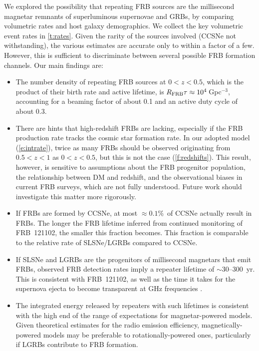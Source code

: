 \documentclass[twocolumn]{aastex6}
\newcommand{\apx}{\ensuremath{\sim}}
\newcommand{\repeater}{FRB~121102}
\begin{document}
We explored the possibility that repeating FRB sources are the millisecond magnetar remnants of superluminous supernovae and GRBs, by comparing volumetric rates and host galaxy demographics. We collect the key volumetric event rates in \autoref{t:rates}. Given the rarity of the sources involved (CCSNe not withstanding), the various estimates are accurate only to within a factor of a few. However, this is sufficient to discriminate between several possible FRB formation channels. Our main findings are:
\begin{itemize}

\item The number density of repeating FRB sources at $0<z<0.5$, which is the product of their birth rate and active lifetime, is $R_{\rm FRB} \tau\approx 10^4$\,Gpc$^{-3}$, accounting for a beaming factor of about 0.1 and an active duty cycle of about 0.3.

\item There are hints that high-redshift FRBs are lacking, especially if the FRB production rate tracks the cosmic star formation rate. In our adopted model (\autoref{e:intrate}), twice as many FRBs should be observed originating from $0.5 < z < 1$ as $0 < z < 0.5$, but this is not the case (\autoref{f:redshifts}). This result, however, is sensitive to assumptions about the FRB progenitor population, the relationship between DM and redshift, and the observational biases in current FRB surveys, which are not fully understood. Future work should investigate this matter more rigorously.

\item If FRBs are formed by CCSNe, at most $\approx 0.1$\%\ of CCSNe actually result in FRBs. The longer the FRB lifetime inferred from continued monitoring of \repeater, the smaller this fraction becomes. This fraction is comparable to the relative rate of SLSNe/LGRBs compared to CCSNe.

\item If SLSNe and LGRBs are the progenitors of millisecond magnetars that emit FRBs, observed FRB detection rates imply a repeater lifetime of \apx30--300~yr. This is consistent with \repeater, as well as the time it takes for the supernova ejecta to become transparent at GHz frequencies \citep{mbm.2017}. 

\item The integrated energy released by repeaters with such lifetimes is consistent with the high end of the range of expectations for magnetar-powered models.  Given theoretical estimates for the radio emission efficiency, magnetically-powered models may be preferable to rotationally-powered ones, particularly if LGRBs contribute to FRB formation.


\end{itemize}
\end{document}
